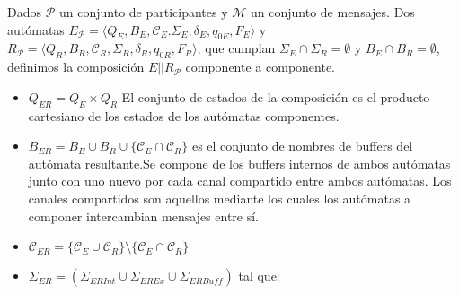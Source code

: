 \begin{definition}[Composición]
Dados $\mathcal{P}$ un conjunto de participantes y $\mathcal{M}$ un conjunto de mensajes. Dos autómatas  $E_\mathcal{P} = \langle Q_E, B_E, \mathcal{C}_E. \Sigma_E, \delta_E, q_{0E}, F_E\rangle$ y $R_\mathcal{P} = \langle Q_R, B_R, \mathcal{C}_R, \Sigma_R, \delta_R,  q_{0R}, F_R\rangle$, que cumplan $\Sigma_E \cap \Sigma_R = \emptyset$ y $ B_E \cap B_R = \emptyset$, definimos la composición $E||R_\mathcal{P}$ componente a componente.

\begin{itemize}
\item $Q_{ER} = Q_E \times Q_R$ El conjunto de estados de la composición es el producto cartesiano de los estados de los autómatas componentes. 

\item $B_{ER} = B_E \cup B_R \cup \{\mathcal{C}_{E} \cap \mathcal{C}_{R}\}$ es el conjunto de nombres de buffers del autómata resultante.Se compone de los buffers internos de ambos autómatas junto con uno nuevo por cada canal compartido entre ambos autómatas. Los canales compartidos son aquellos mediante los cuales los autómatas a componer intercambian mensajes entre sí.

\item $\mathcal{C}_{ER}= \{ \mathcal{C}_{E} \cup \mathcal{C}_{R} \} \setminus \{ \mathcal{C}_{E} \cap \mathcal{C}_{R} \}$

\item $\Sigma_{ER} = (\Sigma_{\mathit{ERInt
}} \cup \Sigma_{\mathit{EREx}} \cup \Sigma_{\mathit{ERBuff}})$ tal que: 
\end{itemize}
\end{definition}
